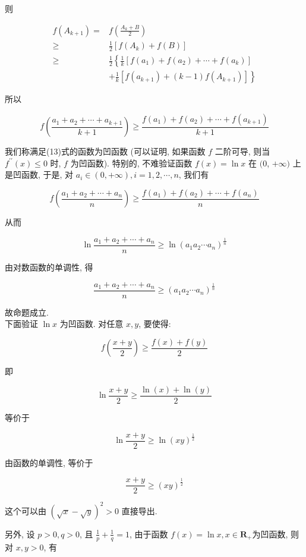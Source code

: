 则

$$
\begin{aligned}
f\left(A_{k+1}\right)= & f\left(\frac{A_{k}+B}{2}\right) \\
\geqslant & \frac{1}{2}\left[f\left(A_{k}\right)+f(B)\right] \\
\geqslant & \frac{1}{2}\left\{\frac{1}{k}\left[f\left(a_{1}\right)+f\left(a_{2}\right)+\cdots+f\left(a_{k}\right)\right]\right. \\
& \left.+\frac{1}{k}\left[f\left(a_{k+1}\right)+(k-1) f\left(A_{k+1}\right)\right]\right\}
\end{aligned}
$$

所以

$$
f\left(\frac{a_{1}+a_{2}+\cdots+a_{k+1}}{k+1}\right) \geqslant \frac{f\left(a_{1}\right)+f\left(a_{2}\right)+\cdots+f\left(a_{k+1}\right)}{k+1}
$$

我们称满足(13)式的函数为凹函数 (可以证明, 如果函数 $f$ 二阶可导, 则当 $f^{\prime \prime}(x) \leqslant 0$ 时, $f$ 为凹函数). 特别的, 不难验证函数 $f(x)=\ln x$ 在 $(0$, $+\infty)$ 上是凹函数, 于是, 对 $a_{i} \in(0,+\infty), i=1,2, \cdots, n$, 我们有

$$
f\left(\frac{a_{1}+a_{2}+\cdots+a_{n}}{n}\right) \geqslant \frac{f\left(a_{1}\right)+f\left(a_{2}\right)+\cdots+f\left(a_{n}\right)}{n}
$$

从而

$$
\ln \frac{a_{1}+a_{2}+\cdots+a_{n}}{n} \geqslant \ln \left(a_{1} a_{2} \cdots a_{n}\right)^{\frac{1}{n}}
$$

由对数函数的单调性, 得

$$
\frac{a_{1}+a_{2}+\cdots+a_{n}}{n} \geqslant\left(a_{1} a_{2} \cdots a_{n}\right)^{\frac{1}{n}}
$$

故命题成立.\\
下面验证 $\ln x$ 为凹函数. 对任意 $x, y$, 要使得:

$$
f\left(\frac{x+y}{2}\right) \geqslant \frac{f(x)+f(y)}{2}
$$

即

$$
\ln \frac{x+y}{2} \geqslant \frac{\ln (x)+\ln (y)}{2}
$$

等价于

$$
\ln \frac{x+y}{2} \geqslant \ln (x y)^{\frac{1}{2}}
$$

由函数的单调性, 等价于

$$
\frac{x+y}{2} \geqslant(x y)^{\frac{1}{2}}
$$

这个可以由 $(\sqrt{x}-\sqrt{y})^{2}>0$ 直接导出.

另外, 设 $p>0, q>0$, 且 $\frac{1}{p}+\frac{1}{q}=1$, 由于函数 $f(x)=\ln x, x \in \mathbf{R}_{+}$为凹函数, 则对 $x, y>0$, 有

